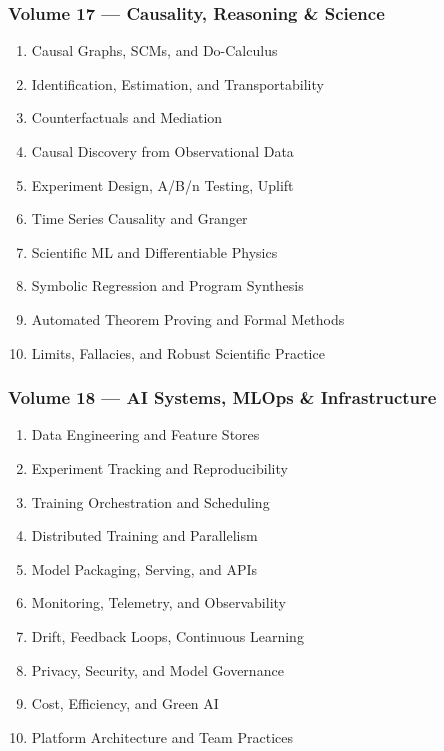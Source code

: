 \documentclass[
  letterpaper,
  DIV=11,
  numbers=noendperiod]{scrreprt}
\providecommand{\tightlist}{%
  \setlength{\itemsep}{0pt}\setlength{\parskip}{0pt}}
\begin{document}
\subsubsection{Volume 17 --- Causality, Reasoning \&
Science}\label{volume-17-causality-reasoning-science}

\begin{enumerate}
\def\labelenumi{\arabic{enumi}.}
\setcounter{enumi}{160}
\tightlist
\item
  Causal Graphs, SCMs, and Do-Calculus
\item
  Identification, Estimation, and Transportability
\item
  Counterfactuals and Mediation
\item
  Causal Discovery from Observational Data
\item
  Experiment Design, A/B/n Testing, Uplift
\item
  Time Series Causality and Granger
\item
  Scientific ML and Differentiable Physics
\item
  Symbolic Regression and Program Synthesis
\item
  Automated Theorem Proving and Formal Methods
\item
  Limits, Fallacies, and Robust Scientific Practice
\end{enumerate}

\subsubsection{Volume 18 --- AI Systems, MLOps \&
Infrastructure}\label{volume-18-ai-systems-mlops-infrastructure}

\begin{enumerate}
\def\labelenumi{\arabic{enumi}.}
\setcounter{enumi}{170}
\tightlist
\item
  Data Engineering and Feature Stores
\item
  Experiment Tracking and Reproducibility
\item
  Training Orchestration and Scheduling
\item
  Distributed Training and Parallelism
\item
  Model Packaging, Serving, and APIs
\item
  Monitoring, Telemetry, and Observability
\item
  Drift, Feedback Loops, Continuous Learning
\item
  Privacy, Security, and Model Governance
\item
  Cost, Efficiency, and Green AI
\item
  Platform Architecture and Team Practices
\end{enumerate}
\end{document}
